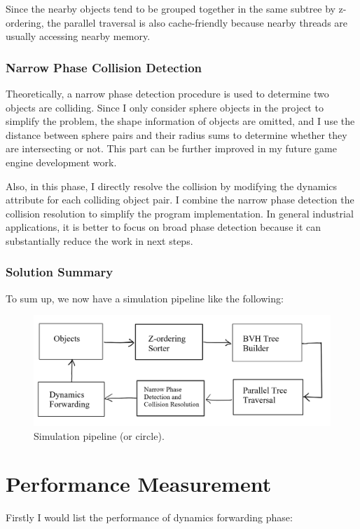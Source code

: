 \documentclass[11pt]{article}
\begin{document}
Since the nearby objects tend to be grouped together in the same subtree by z-ordering, the parallel traversal is also cache-friendly because nearby threads are usually accessing nearby memory.

\subsubsection{Narrow Phase Collision Detection}
\label{sec:org15c421f}

Theoretically, a narrow phase detection procedure is used to determine two objects are colliding. Since I only consider sphere objects in the project to simplify the problem, the shape information of objects are omitted, and I use the distance between sphere pairs and their radius sums to determine whether they are intersecting or not. This part can be further improved in my future game engine development work.

Also, in this phase, I directly resolve the collision by modifying the dynamics attribute for each colliding object pair. I combine the narrow phase detection the collision resolution to simplify the program implementation. In general industrial applications, it is better to focus on broad phase detection because it can substantially reduce the work in next steps.

\subsubsection{Solution Summary}
\label{sec:org93030bc}
To sum up, we now have a simulation pipeline like the following:
\begin{figure}[htbp]
\centering
\includegraphics[width=.9\linewidth]{./rep_9.png}
\caption{Simulation pipeline (or circle).}
\end{figure}

\section{Performance Measurement}
\label{sec:org9af44c1}
Firstly I would list the performance of dynamics forwarding phase:
\end{document}
